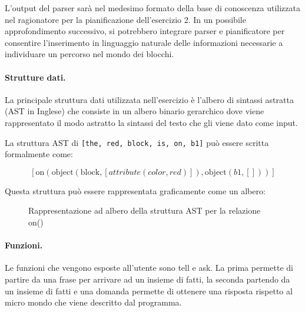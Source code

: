\documentclass[12pt,twoside]{report}
\begin{document}
L'output del parser sarà nel medesimo formato della base di conoscenza utilizzata nel ragionatore per la pianificazione dell'esercizio 2. In un possibile approfondimento successivo, si potrebbero integrare parser e pianificatore per consentire l'inserimento in linguaggio naturale delle informazioni necessarie a individuare un percorso nel mondo dei blocchi.

\paragraph{Strutture dati.} La principale struttura dati utilizzata nell'esercizio è l'albero di sintassi astratta (AST in Inglese) che consiste in un albero binario gerarchico dove viene rappresentato il modo astratto la sintassi del testo che gli viene dato come input.

La struttura AST di \texttt{[the, red, block, is, on, b1]} può essere scritta formalmente come:

\[
[\text{on}(\text{object}(\text{block},[attribute(color,red)]),\text{object}(b1,[]))]
\]

Questa struttura può essere rappresentata graficamente come un albero:

\begin{figure}[h]
\centering
{}
\caption{Rappresentazione ad albero della struttura AST per la relazione on()}
\label{fig:ast_structure}
\end{figure}


\paragraph{Funzioni.} Le funzioni che vengono esposte all'utente sono tell e ask. La prima permette di partire da una frase per arrivare ad un insieme di fatti, la seconda partendo da un insieme di fatti e una domanda permette di ottenere una risposta rispetto al micro mondo che viene descritto dal programma.
\end{document}
